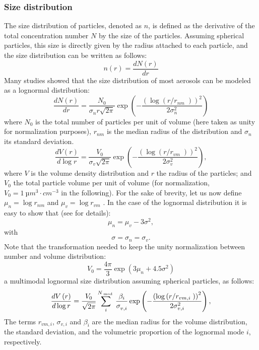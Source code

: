 \documentclass{article}
\begin{document}
\subsubsection{Size distribution}
The size distribution of particles, denoted as $n$, is defined as the derivative of the total concentration number $N$ by the size of the particles. Assuming spherical particles, this size is directly given by the radius attached to each particle, and the size distribution can be written as follows:
\begin{equation}  
                              	n\left( r \right)=\frac{dN\left( r \right)}{dr}                                 	
\end{equation}
Many studies showed that the size distribution of most aerosols can be modeled as a lognormal distribution:
\begin{equation}  
\frac{dN\left( r \right)}{dr}=\frac{{{N}_{0}}}{\sigma _{n}^{{}}r\sqrt{2\pi }}\exp \left( -\frac{{{\left( \log \left( {r}/{{{r}_{nm}}}\; \right) \right)}^{2}}}{2\sigma _{n}^{2}} \right)                 	
\end{equation}
where $N_0$ is the total number of particles per unit of volume (here taken as unity for normalization purposes), $r_{nm}$ is the median radius of the distribution and ${{\sigma }_{n}}$ its standard deviation.
\begin{equation}  
\frac{dV\left( r \right)}{d\log r}=\frac{{{V}_{0}}}{\sigma _{v}^{{}}\sqrt{2\pi }}\exp \left( -\frac{{{\left( \log \left( {r}/{{{r}_{vm}}}\; \right) \right)}^{2}}}{2\sigma _{v}^{2}} \right),
\end{equation}
where $V$ is the volume density distribution and $r$ the radius of the particles; and $V_0$ the total particle volume per unit of volume (for normalization, $V_0=1\ µm^3\cdot  cm^{-3}$ in the following).
For the sake of brevity, let us now define ${{\mu }_{n}}=\log {{r}_{nm}}$ and ${{\mu }_{v}}=\log {{r}_{vm}}$ . In the case of the lognormal distribution it is easy to show that (see \cite{Grainger2012} for details):
\begin{equation}  
                            {{\mu }_{n}}={{\mu }_{v}}-3{{\sigma }^{2}},
\end{equation}                            	
with
\begin{equation}  
                             	\sigma ={{\sigma }_{n}}={{\sigma }_{v}}.
\end{equation}
Note that the transformation needed to keep the unity normalization between number and volume distribution:
   \[{{V}_{0}}=\frac{4\pi }{3}\exp \left( 3{{\mu }_{n}}+4.5{{\sigma }^{2}} \right)\]  	
a multimodal lognormal size distribution assuming spherical particles, as follows:
\[\frac{dV\left( r \right)}{d\log r}=\frac{{{V}_{0}}}{\sqrt{2\pi }}\sum\limits_{i}^{{{N}_{\bmod }}}{\frac{{{\beta }_{i}}}{\sigma _{v,i}^{{}}}}\exp \left( -\frac{{{\left( \log \left( {r}/{{{r}_{vm,i}}}\; \right) \right)}^{2}}}{2\sigma _{v,i}^{2}} \right),\]                                                              	
The terms ${{r}_{vm,i}}$, ${{\sigma }_{v,i}}$ and ${{\beta }_{i}}$ are the median radius for the volume distribution, the standard deviation, and the volumetric proportion of the lognormal mode $i$, respectively.
\end{document}
